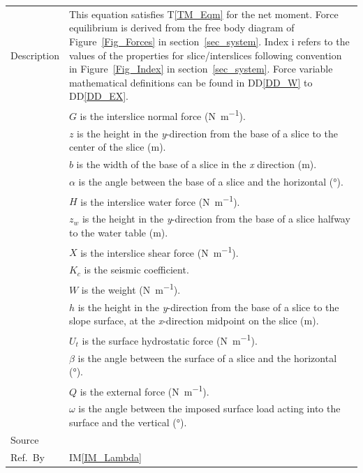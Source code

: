 \documentclass[12pt]{article}
\newcommand{\colAwidth}{0.13\textwidth}
\newcommand{\colBwidth}{0.82\textwidth}
\newcommand{\tref}[1]{T\ref{#1}}
\newcommand{\iref}[1]{IM\ref{#1}}
\newcommand{\ddref}[1]{DD\ref{#1}}
\begin{document}
\begin{minipage}{\textwidth}
\begin{tabular}{| p{\colAwidth} | p{\colBwidth}|}
 \hline Description & This equation satisfies \tref{TM_Eqm} for the net moment. 
 Force equilibrium is derived from the free body diagram of 
 Figure~\ref{Fig_Forces} in section~\ref{sec_system}. Index $\text{i}$ refers 
 to the values of the properties for slice/interslices following convention in
 Figure~\ref{Fig_Index} in section~\ref{sec_system}. Force variable
 mathematical definitions can be found in \ddref{DD_W} to \ddref{DD_EX}.\\
 &$G$ is the interslice normal force (\si{\newton\per\meter}). \\
 &$z$ is the height in the \textit{y}-direction from the base of a slice 
 to the center of the slice (\si{\meter}).\\
 &$b$ is the width of the base of a slice in the \textit{x} direction 
 (\si{\meter}).\\
 &$\alpha$ is the angle between the base of a slice and the 
 horizontal (\si{\degree}). \\
 &$H$ is the interslice water force (\si{\newton\per\meter}). \\
 &$z_w$ is the height in the \textit{y}-direction from the base of a slice 
 halfway to the water table (\si{\meter}).\\
 &$X$ is the interslice shear force (\si{\newton\per\meter}). \\
 &$K_c$ is the seismic coefficient. \\
 &$W$ is the weight (\si{\newton\per\meter}). \\
 &$h$ is the height in the \textit{y}-direction from the base of a slice 
 to the slope surface, at the \textit{x}-direction midpoint on the slice 
 (\si{\meter}).\\
 &$U_t$ is the surface hydrostatic force (\si{\newton\per\meter}). \\
 &$\beta$ is the angle between the surface of a slice and the 
 horizontal (\si{\degree}). \\
 &$Q$ is the external force (\si{\newton\per\meter}). \\
 &$\omega$ is the angle between the imposed surface load acting into 
 the surface and the vertical (\si{\degree}). \\

  \hline Source & \cite{ZhuEtAl2005}\\
  
  \hline Ref.\ By & \iref{IM_Lambda}\\
  
  \hline
\end{tabular}
\end{minipage}\\
\end{document}
